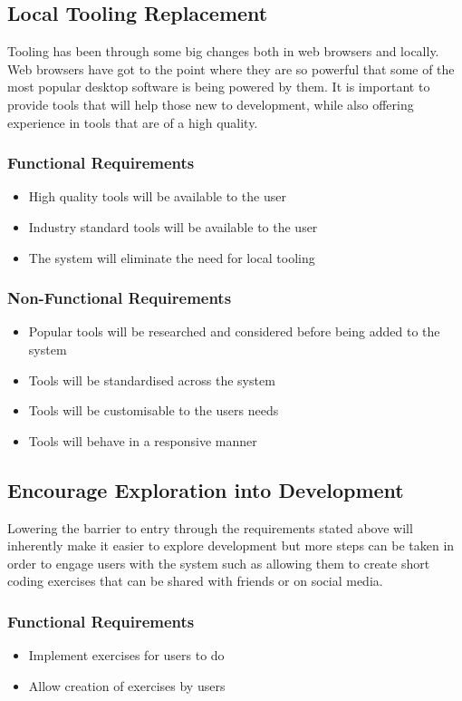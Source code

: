 \subsection{Local Tooling Replacement}
Tooling has been through some big changes both in web browsers and locally. Web browsers have got to the point where they are so powerful that some of the most popular desktop software is being powered by them\cite{carlo}. It is important to provide tools that will help those new to development, while also offering experience in tools that are of a high quality.

\subsubsection{Functional Requirements}
\begin{itemize}
    \item High quality tools will be available to the user
    \item Industry standard tools will be available to the user
    \item The system will eliminate the need for local tooling
\end{itemize}
\subsubsection{Non-Functional Requirements}
\begin{itemize}
    \item Popular tools will be researched and considered before being added to the system
    \item Tools will be standardised across the system
    \item Tools will be customisable to the users needs
    \item Tools will behave in a responsive manner
\end{itemize}

\subsection{Encourage Exploration into Development}
Lowering the barrier to entry through the requirements stated above will inherently make it easier to explore development but more steps can be taken in order to engage users with the system such as allowing them to create short coding exercises that can be shared with friends or on social media.

\subsubsection{Functional Requirements}
\begin{itemize}
    \item Implement exercises for users to do
    \item Allow creation of exercises by users
\end{itemize}
